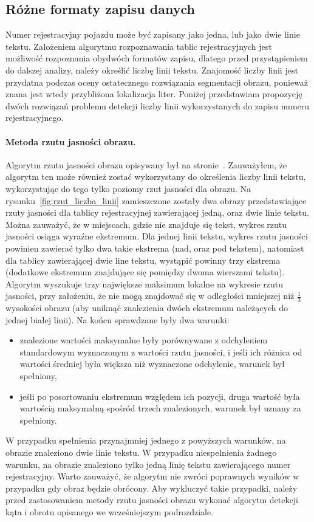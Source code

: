 \subsection{Różne formaty zapisu danych}\label{ssec:different_formats}
Numer rejestracyjny pojazdu może być zapisany jako jedna, lub jako dwie linie tekstu. Założeniem algorytmu rozpoznawania tablic rejestracyjnych jest możliwość rozpoznania obydwóch formatów zapisu, dlatego przed przystąpieniem do dalszej analizy, należy określić liczbę linii tekstu. Znajomość liczby linii jest przydatna podczas oceny ostatecznego rozwiązania segmentacji obrazu, ponieważ znana jest wtedy przybliżona lokalizacja liter. Poniżej przedstawiam propozycję dwóch rozwiązań problemu detekcji liczby linii wykorzystanych do zapisu numeru rejestracyjnego.
\paragraph{Metoda rzutu jasności obrazu.} Algorytm rzutu jasności obrazu opisywany był na stronie~\pageref{ssec:rzut_jasnosci}. Zauważyłem, że algorytm ten może również zostać wykorzystany do określenia liczby linii tekstu, wykorzystując do tego tylko poziomy rzut jasności dla obrazu. Na rysunku~\ref{fig:rzut_liczba_linii} zamieszczone zostały dwa obrazy przedstawiające rzuty jasności dla tablicy rejestracyjnej zawierającej jedną, oraz dwie linie tekstu. Można zauważyć, że w miejscach, gdzie nie znajduje się tekst, wykres rzutu jasności osiąga wyraźne ekstremum. Dla jednej linii tekstu, wykres rzutu jasności powinien zawierać tylko dwa takie ekstrema (nad, oraz pod tekstem), natomiast dla tablicy zawierającej dwie line tekstu, wystąpić powinny trzy ekstrema (dodatkowe ekstremum znajdujące się pomiędzy dwoma wierszami tekstu).\\
Algorytm wyszukuje trzy największe maksimum lokalne na wykresie rzutu jasności, przy założeniu, że nie mogą znajdować się w odległości mniejszej niż $\frac{1}{3}$ wysokości obrazu (aby uniknąć znalezienia dwóch ekstremum należących do jednej białej linii). Na końcu sprawdzane były dwa warunki:
\begin{itemize}
  \item znalezione wartości maksymalne były porównywane z odchyleniem standardowym wyznaczonym z wartości rzutu jasności, i jeśli ich różnica od wartości średniej była większa niż wyznaczone odchylenie, warunek był spełniony,
  \item jeśli po posortowaniu ekstremum względem ich pozycji, druga wartość była wartością maksymalną spośród trzech znalezionych, warunek był uznany za spełniony.
\end{itemize}
W przypadku spełnienia przynajmniej jednego z powyższych warunków, na obrazie znaleziono dwie linie tekstu. W przypadku niespełnienia żadnego warunku, na obrazie znaleziono tylko jedną linię tekstu zawierającego numer rejestracyjny. Warto zauważyć, że algorytm nie zwróci poprawnych wyników w przypadku gdy obraz będzie obrócony. Aby wykluczyć takie przypadki, należy przed zastosowaniem metody rzutu jasności obrazu wykonać algorytm detekcji kąta i obrotu opisanego we wcześniejszym podrozdziale.


